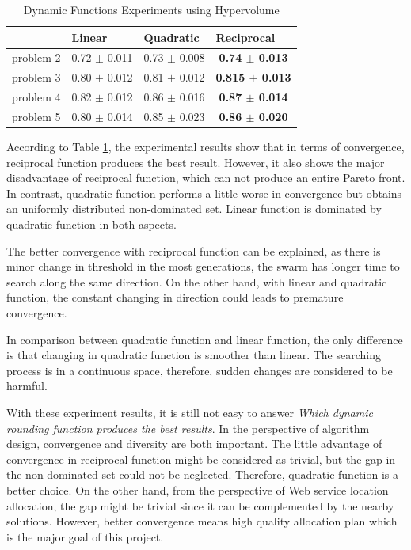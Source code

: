 \begin{table}[H]
\centering
\footnotesize
\caption{Dynamic Functions Experiments using Hypervolume}
\label{tab:hyperDynamic}
\begin{tabular}{l|c|c|c}
\hline
          & \multicolumn{1}{l|}{Linear} & \multicolumn{1}{l|}{Quadratic} & \multicolumn{1}{l}{Reciprocal}  \\ \hline
problem 2 & 0.72 $\pm$ 0.011            & 0.73 $\pm$ 0.008               & \textbf{0.74 $\pm$ 0.013}  	 \\ 
problem 3 & 0.80 $\pm$ 0.012            & 0.81 $\pm$ 0.012               & \textbf{0.815 $\pm$ 0.013}  		\\ 
problem 4 & 0.82 $\pm$ 0.012            & 0.86 $\pm$ 0.016               & \textbf{0.87 $\pm$ 0.014}  	\\ 
problem 5 & 0.80 $\pm$ 0.014            & 0.85 $\pm$ 0.023               & \textbf{0.86 $\pm$ 0.020}  	\\ \hline
\end{tabular}
\end{table}

According to Table \ref{tab:hyperDynamic}, the experimental results show that in terms of convergence, reciprocal function produces the best result. 
However, it also shows the major disadvantage of reciprocal function, which can not produce an entire Pareto front. In contrast, quadratic function performs
a little worse in convergence but obtains an uniformly distributed non-dominated set. Linear function is dominated by quadratic function in both aspects.

The better convergence with reciprocal function can be explained, as there is minor change in threshold in the most generations, the swarm has longer time to search along the same direction.
On the other hand, with linear and quadratic function, the constant changing in direction could leads to premature convergence.

In comparison between quadratic function and linear function, the only difference is that changing in quadratic function is smoother than linear. 
The searching process is in a continuous space, therefore, sudden changes are considered to be harmful.

With these experiment results, it is still not easy to answer \emph{Which dynamic rounding function produces the best results}. In the perspective of 
algorithm design, convergence and diversity are both important. The little advantage of convergence in reciprocal function might be considered as trivial, but the 
gap in the non-dominated set could not be neglected. Therefore, quadratic function is a better choice. On the other hand, from the perspective of Web service location
allocation, the gap might be trivial since it can be complemented by the nearby solutions. However, better convergence means high quality allocation plan which is 
the major goal of this project.


